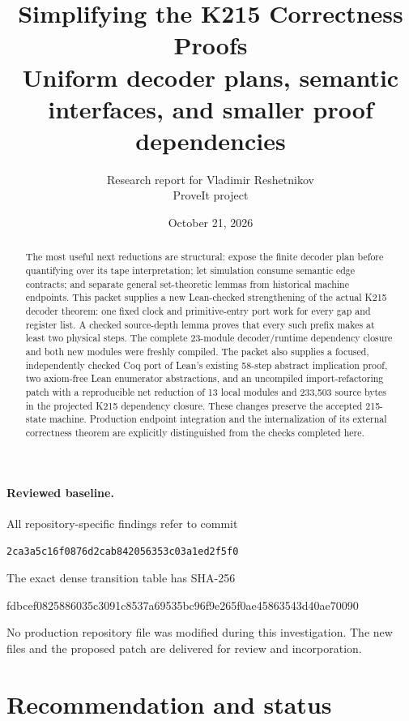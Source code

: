 \documentclass[11pt,letterpaper]{article}
\title{\color{ink}\textbf{Simplifying the K215 Correctness Proofs}\\[0.4em]
  \large Uniform decoder plans, semantic interfaces, and smaller proof dependencies}
\author{Research report for Vladimir Reshetnikov\\\small ProveIt project}
\date{October 21, 2026}
\newcommand{\base}{\texttt{2ca3a5c16f0876d2cab842056353c03a1ed2f5f0}}
\begin{document}
\maketitle
\thispagestyle{empty}

\begin{abstract}
The most useful next reductions are structural: expose the finite decoder plan before
quantifying over its tape interpretation; let simulation consume semantic edge contracts;
and separate general set-theoretic lemmas from historical machine endpoints. This packet
supplies a new Lean-checked strengthening of the actual K215 decoder theorem: one fixed
clock and primitive-entry port work for every gap and register list. A checked source-depth
lemma proves that every such prefix makes at least two physical steps. The complete
23-module decoder/runtime dependency closure and both new modules were freshly compiled.
The packet also supplies a focused, independently checked Coq port of Lean's existing
58-step abstract implication proof, two axiom-free Lean enumerator abstractions, and an
uncompiled import-refactoring patch with a reproducible net reduction of 13 local modules
and 233,503 source bytes in the projected K215 dependency closure. These changes preserve
the accepted 215-state machine. Production endpoint integration and the internalization
of its external correctness theorem are explicitly distinguished from the checks completed here.
\end{abstract}

\paragraph{Reviewed baseline.}
All repository-specific findings refer to commit
\begin{center}\small\base\end{center}
The exact dense transition table has
SHA-256
\begin{center}\small\ttfamily
fdbcef0825886035c3091c8537a69535bc96f9e265f0ae45863543d40ae70090
\end{center}
No production repository file was modified during this investigation. The new files and
the proposed patch are delivered for review and incorporation.

\clearpage
\tableofcontents
\clearpage

\section{Recommendation and status}
\end{document}
